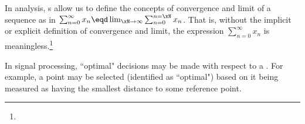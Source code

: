 \begin{enume}
  \item In analysis, s allow us to define the concepts of convergence and limit of a sequence as in
   $\sum_{n=0}^\infty x_n \eqd \lim_{\xN\to\infty}\sum_{n=0}^{n=\xN} x_n$.
   That is, without the implicit or explicit definition of convergence and limit, the expression 
   $\sum_{n=0}^\infty x_n$ is meaningless.\footnote{
  }

  \item In signal processing, ``optimal" decisions may be made with respect to a .
    For example, a point may be selected (identified as ``optimal") based on it being measured as having the smallest distance
    to some reference point. 
\end{enume}


